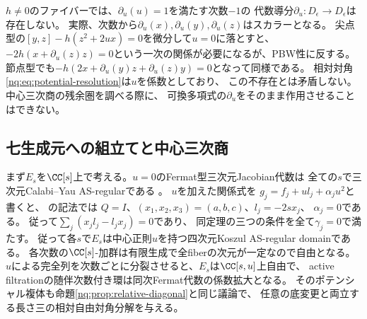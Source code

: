 \begin{remark}[中心方向の通常微分は使えない]\label{nq:rem:no-derivation}
$h\ne0$のファイバーでは、$\partial_u(u)=1$を満たす次数$-1$の
代数導分$\partial_u:D_\epsilon\to D_\epsilon$は存在しない。
実際、次数から$\partial_u(x),\partial_u(y),\partial_u(z)$はスカラーとなる。
尖点型の$[y,z]-h(z^2+2ux)=0$を微分して$u=0$に落とすと、
$-2h(x+\partial_u(z)z)=0$という一次の関係が必要になるが、PBW性に反する。
節点型でも$-h(2x+\partial_u(y)z+\partial_u(z)y)=0$となって同様である。
相対対角\eqref{nq:eq:potential-resolution}は$u$を係数としており、
この不存在とは矛盾しない。中心三次商の残余圏を調べる際に、
可換多項式の$\partial_u$をそのまま作用させることはできない。
\end{remark}

\subsection{七生成元への組立てと中心三次商}
まず$E_s$を$\CC[s]$上で考える。$u=0$のFermat型三次元Jacobian代数は
全ての$s$で三次元Calabi--Yau AS-regularである
\cite[Theorem 4.2(1)]{PMoriSmith}。
$u$を加えた関係式を
$g_j=f_j+u l_j+\alpha_j u^2$と書くと、
\cite[Theorem 3.1.3]{LBSVNE12}の記法では
$Q=I$、$(x_1,x_2,x_3)=(a,b,c)$、$l_j=-2s x_j$、
$\alpha_j=0$である。
従って$\sum_j(x_jl_j-l_jx_j)=0$であり、
同定理の三つの条件を全て$\gamma_j=0$で満たす。
従って各$s$で$E_s$は中心正則$u$を持つ四次元Koszul AS-regular domainである。
各次数の$\CC[s]$-加群は有限生成で全fiberの次元が一定なので自由となる。
$u$による完全列を次数ごとに分裂させると、$E_s$は$\CC[s,u]$上自由で、
active filtrationの随伴次数付き環は同次Fermat代数の係数拡大となる。
そのポテンシャル複体も命題\ref{nq:prop:relative-diagonal}と同じ議論で、
任意の底変更と両立する長さ三の相対自由対角分解を与える。


